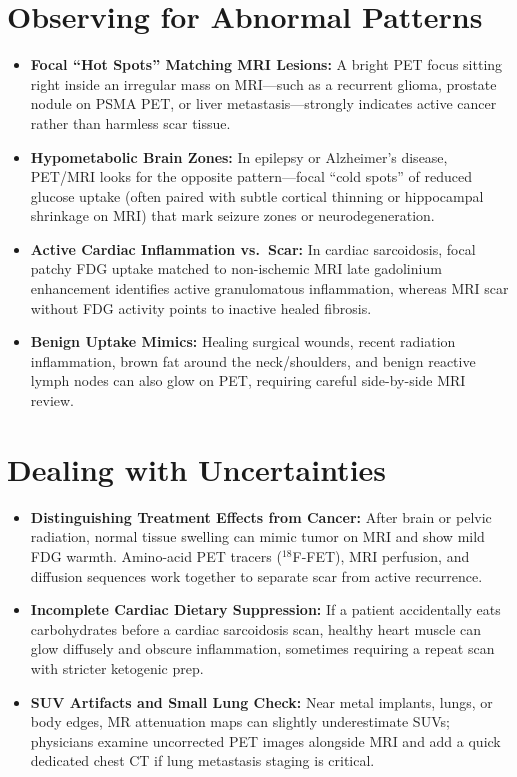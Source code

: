 \section{Observing for Abnormal Patterns}
\begin{itemize}
\item \textbf{Focal ``Hot Spots'' Matching MRI Lesions:} A bright PET focus sitting right inside an irregular mass on MRI---such as a recurrent glioma, prostate nodule on PSMA PET, or liver metastasis---strongly indicates active cancer rather than harmless scar tissue.
\item \textbf{Hypometabolic Brain Zones:} In epilepsy or Alzheimer's disease, PET/MRI looks for the opposite pattern---focal ``cold spots'' of reduced glucose uptake (often paired with subtle cortical thinning or hippocampal shrinkage on MRI) that mark seizure zones or neurodegeneration.
\item \textbf{Active Cardiac Inflammation vs.\ Scar:} In cardiac sarcoidosis, focal patchy FDG uptake matched to non-ischemic MRI late gadolinium enhancement identifies active granulomatous inflammation, whereas MRI scar without FDG activity points to inactive healed fibrosis.
\item \textbf{Benign Uptake Mimics:} Healing surgical wounds, recent radiation inflammation, brown fat around the neck/shoulders, and benign reactive lymph nodes can also glow on PET, requiring careful side-by-side MRI review.
\end{itemize}

\section{Dealing with Uncertainties}
\begin{itemize}
\item \textbf{Distinguishing Treatment Effects from Cancer:} After brain or pelvic radiation, normal tissue swelling can mimic tumor on MRI and show mild FDG warmth. Amino-acid PET tracers ($^{18}$F-FET), MRI perfusion, and diffusion sequences work together to separate scar from active recurrence.
\item \textbf{Incomplete Cardiac Dietary Suppression:} If a patient accidentally eats carbohydrates before a cardiac sarcoidosis scan, healthy heart muscle can glow diffusely and obscure inflammation, sometimes requiring a repeat scan with stricter ketogenic prep.
\item \textbf{SUV Artifacts and Small Lung Check:} Near metal implants, lungs, or body edges, MR attenuation maps can slightly underestimate SUVs; physicians examine uncorrected PET images alongside MRI and add a quick dedicated chest CT if lung metastasis staging is critical.
\end{itemize}

